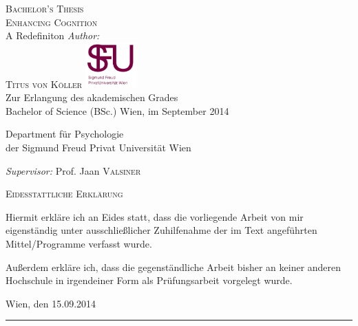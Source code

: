 




\frontmatter
{}
\begin{titlepage} 
\begin{center}
\textsc{\Large Bachelor's Thesis}\\[0.5cm]
\textsc{\Huge Enhancing Cognition} \\[0.4cm]
        {\large A Redefiniton}
\vfill
\large \emph{Author:}\\[0.3cm]
\textsc{\Huge{Titus von Köller}}
\vfill
\includegraphics[width=0.15\textwidth]{SFU.png}~\\[1cm]
Zur Erlangung des akademischen Grades\\
Bachelor of Science (BSc.)
\vfill
{\large Wien, im September 2014}
\vfill
\begin{flushleft} \large
Department für Psychologie\\
der Sigmund Freud Privat Universität Wien

\emph{Supervisor:} Prof. Jaan \textsc{Valsiner}
\end{flushleft}
\end{center} 
\end{titlepage}

\thispagestyle{empty}
\mbox{}
\clearpage

\begin{titlepage} 
\begin{center}
\textsc{\Huge Eidesstattliche Erklärung}
\end{center}


\begin{onehalfspacing}

\Large Hiermit erkläre ich an Eides statt, dass die vorliegende Arbeit von mir eigenständig unter ausschließlicher Zuhilfenahme der im Text angeführten Mittel/Programme verfasst wurde. 

Außerdem erkläre ich, dass die gegenständliche Arbeit bisher an keiner anderen Hoch\-schule in irgendeiner Form als Prüfungsarbeit vorgelegt wurde.

\end{onehalfspacing}

\large Wien, den 15.09.2014 \hfill \rule[-1pt]{6cm}{.2pt}

\end{titlepage}
